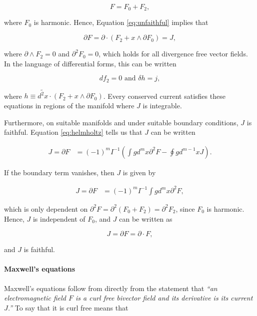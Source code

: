 \documentclass{article}
\begin{document}
\begin{equation}
  F = F_0 + F_2,
\end{equation}

where $F_0$ is harmonic. Hence, Equation \ref{eq:unfaithful} implies that

\begin{equation}
  \partial F = \partial \cdot (F_2 + x \wedge \partial F_0) = J, \label{eq:coexact}
\end{equation}

where $\partial \wedge F_2 = 0$ and $\partial^2 F_0 = 0$, which holds for all divergence free vector fields. In the language of differential forms, this can be written

\begin{equation}
  d f_2 = 0 \text{ and } \delta h = j,
\end{equation}

where $h \equiv \widetilde{d^{2}x} \cdot (F_2 + x \wedge \partial F_0)$. Every conserved current satisfies these equations in regions of the manifold where $J$ is integrable.

Furthermore, on suitable manifolds and under suitable boundary conditions, $J$ is faithful. Equation \ref{eq:helmholtz} tells us that $J$ can be written

\begin{align}
  J = \partial F &= (-1)^m I^{-1} \left(\int g d^{m}x \partial^2 F - \oint g d^{m-1}x J \right).
\end{align}

If the boundary term vanishes, then $J$ is given by

\begin{align}
  J = \partial F &= (-1)^m I^{-1} \int g d^{m}x \partial^2 F,
\end{align}

which is only dependent on $\partial^2 F = \partial^2 (F_0 + F_2) = \partial^2 F_2$, since $F_0$ is harmonic. Hence, $J$ is independent of $F_0$, and $J$ can be written as 

\begin{equation}
  J = \partial F = \partial \cdot F,
\end{equation}

and $J$ is faithful.

\paragraph{Maxwell's equations}

Maxwell's equations follow from directly from the statement that \emph{``an electromagnetic field $F$ is a curl free bivector field and its derivative is its current $J$.''} To say that it is curl free means that
\end{document}
